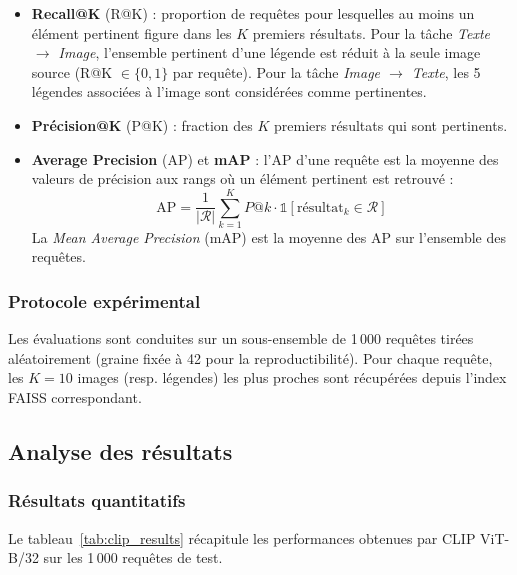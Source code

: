 \documentclass[a4paper,11pt]{article}
\begin{document}
\begin{itemize}
    \item \textbf{Recall@K} (R@K) : proportion de requêtes pour lesquelles
          au moins un élément pertinent figure dans les $K$ premiers résultats.
          Pour la tâche \textit{Texte $\rightarrow$ Image}, l'ensemble pertinent
          d'une légende est réduit à la seule image source (R@K $\in \{0,1\}$
          par requête).
          Pour la tâche \textit{Image $\rightarrow$ Texte}, les 5 légendes
          associées à l'image sont considérées comme pertinentes.
 
    \item \textbf{Précision@K} (P@K) : fraction des $K$ premiers résultats
          qui sont pertinents.
 
    \item \textbf{Average Precision} (AP) et \textbf{mAP} :
          l'AP d'une requête est la moyenne des valeurs de précision
          aux rangs où un élément pertinent est retrouvé :
          \begin{equation}
              \text{AP} = \frac{1}{|\mathcal{R}|}\sum_{k=1}^{K}
              P@k \cdot \mathbb{1}[\text{résultat}_k \in \mathcal{R}]
          \end{equation}
          La \textit{Mean Average Precision} (mAP) est la moyenne des AP
          sur l'ensemble des requêtes.
\end{itemize}
 
\subsubsection{Protocole expérimental}
 
Les évaluations sont conduites sur un sous-ensemble de 1\,000 requêtes
tirées aléatoirement (graine fixée à 42 pour la reproductibilité).
Pour chaque requête, les $K = 10$ images (resp. légendes) les plus proches
sont récupérées depuis l'index FAISS correspondant.
 



\subsection{Analyse des résultats}
 
\subsubsection{Résultats quantitatifs}
 
Le tableau~\ref{tab:clip_results} récapitule les performances
obtenues par CLIP ViT-B/32 sur les 1\,000 requêtes de test.
\end{document}
